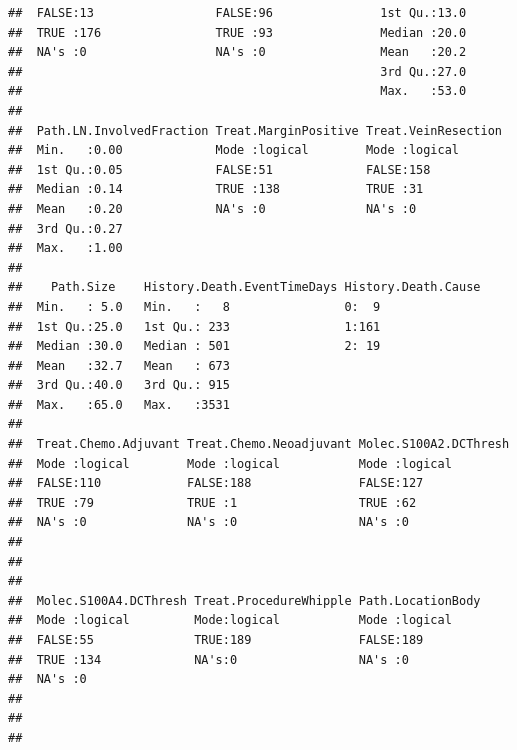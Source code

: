 \documentclass{article}\usepackage[]{graphicx}\usepackage[]{color}
\makeatletter
\newenvironment{kframe}{%
 \def\at@end@of@kframe{}%
 \ifinner\ifhmode%
  \def\at@end@of@kframe{\end{minipage}}%
  \begin{minipage}{\columnwidth}%
 \fi\fi%
 \def\FrameCommand##1{\hskip\@totalleftmargin \hskip-\fboxsep
 \colorbox{shadecolor}{##1}\hskip-\fboxsep
     \hskip-\linewidth \hskip-\@totalleftmargin \hskip\columnwidth}%
 \MakeFramed {\advance\hsize-\width
   \@totalleftmargin\z@ \linewidth\hsize
   \@setminipage}}%
 {\par\unskip\endMakeFramed%
 \at@end@of@kframe}
\newenvironment{knitrout}{}{} %
\makeatother
\begin{document}
\begin{knitrout}
\begin{kframe}
\begin{verbatim}
##  FALSE:13                 FALSE:96               1st Qu.:13.0     
##  TRUE :176                TRUE :93               Median :20.0     
##  NA's :0                  NA's :0                Mean   :20.2     
##                                                  3rd Qu.:27.0     
##                                                  Max.   :53.0     
##                                                                   
##  Path.LN.InvolvedFraction Treat.MarginPositive Treat.VeinResection
##  Min.   :0.00             Mode :logical        Mode :logical      
##  1st Qu.:0.05             FALSE:51             FALSE:158          
##  Median :0.14             TRUE :138            TRUE :31           
##  Mean   :0.20             NA's :0              NA's :0            
##  3rd Qu.:0.27                                                     
##  Max.   :1.00                                                     
##                                                                   
##    Path.Size    History.Death.EventTimeDays History.Death.Cause
##  Min.   : 5.0   Min.   :   8                0:  9              
##  1st Qu.:25.0   1st Qu.: 233                1:161              
##  Median :30.0   Median : 501                2: 19              
##  Mean   :32.7   Mean   : 673                                   
##  3rd Qu.:40.0   3rd Qu.: 915                                   
##  Max.   :65.0   Max.   :3531                                   
##                                                                
##  Treat.Chemo.Adjuvant Treat.Chemo.Neoadjuvant Molec.S100A2.DCThresh
##  Mode :logical        Mode :logical           Mode :logical        
##  FALSE:110            FALSE:188               FALSE:127            
##  TRUE :79             TRUE :1                 TRUE :62             
##  NA's :0              NA's :0                 NA's :0              
##                                                                    
##                                                                    
##                                                                    
##  Molec.S100A4.DCThresh Treat.ProcedureWhipple Path.LocationBody
##  Mode :logical         Mode:logical           Mode :logical    
##  FALSE:55              TRUE:189               FALSE:189        
##  TRUE :134             NA's:0                 NA's :0          
##  NA's :0                                                       
##                                                                
##                                                                
##                                                                

\end{verbatim}
\end{kframe}
\end{knitrout}
\end{document}
